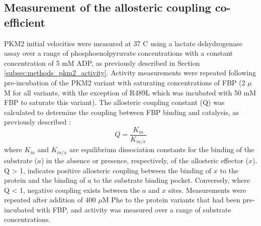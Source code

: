\subsection{Measurement of the allosteric coupling co-efficient}
\label{methods:coupling_coef}
PKM2 initial velocities were measured at 37 \textdegree C using a lactate dehydrogenase assay over a range of phosphoenolpyruvate concentrations with a constant concentration of 5 mM ADP, as previously described in Section \ref{subsec:methods_pkm2_activity}. Activity measurements were repeated following pre-incubation of the PKM2 variant with saturating concentrations of FBP (2 $\mu$M for all variants, with the exception of R489L which was incubated with 50 mM FBP to saturate this variant). The allosteric coupling constant (Q) was calculated to determine the coupling between FBP binding and catalysis, as previously described \cite{Reinhart:2004aa}:
%
%
\begin{equation}
Q = \frac{K_{ia}}{K_{ia/x}}
\end{equation}
%
%
where $K_{ia}$ and $K_{ia/x}$ are equilibrium dissociation constants for the binding of the substrate ($a$) in the absence or presence, respectively, of the allosteric effector ($x$). Q > 1, indicates positive allosteric coupling between the binding of $x$ to the protein and the binding of $a$ to the substrate binding pocket. Conversely, where Q < 1, negative coupling exists between the $a$ and $x$ sites. Measurements were repeated after addition of 400 $\mu$M Phe to the protein variants that had been pre-incubated with FBP, and activity was measured over a range of substrate concentrations. 

